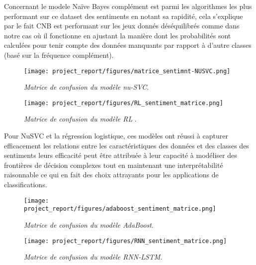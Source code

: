 Concernant le modele Naïve Bayes complément est parmi les algorithmes les plus performant sur ce dataset des sentiments en notant sa rapidité, cela s’explique par le fait CNB est performant sur les jeux donnés déséquilibrés comme dans notre cas où il fonctionne en ajustant la manière dont les probabilités sont calculées pour tenir compte des données manquants par rapport à d’autre classes (basé sur la fréquence complément).\par
\begin{figure}[h]
    \centering
    \begin{minipage}{0.45\textwidth}
        \centering
        \texttt{[image: project\_report/figures/matrice\_sentimnt-NUSVC.png]}
        \caption{\textit{Matrice de confusion du modèle nu-SVC}.}
        \label{fig:figureSHJJJR}
    \end{minipage}\hfill
    \begin{minipage}{0.45\textwidth}
        \centering
        \texttt{[image: project\_report/figures/RL\_sentiment\_matrice.png]}
        \caption{\textit{Matrice de confusion du modèle RL }.}
        \label{fig:figureNBVV}
    \end{minipage}
\end{figure} 
Pour NuSVC et la régression logistique, ces modèles ont réussi à capturer efficacement les relations entre les caractéristiques des données et des classes des sentiments leurs efficacité peut être attribuée à leur capacité à modéliser des frontières de décision complexes tout en maintenant une interprétabilité raisonnable ce qui en fait des choix attrayants pour les applications de classifications.\par
\begin{figure}[h]
    \centering
    \begin{minipage}{0.45\textwidth}
        \centering
        \texttt{[image: project\_report/figures/adaboost\_sentiment\_matrice.png]}
        \caption{\textit{Matrice de confusion du modèle AdaBoost}.}
        \label{fig:figureSHJJJR}
    \end{minipage}\hfill
    \begin{minipage}{0.45\textwidth}
        \centering
        \texttt{[image: project\_report/figures/RNN\_sentiment\_matrice.png]}
        \caption{\textit{Matrice de confusion du modèle RNN-LSTM}.}
        \label{fig:figureNBVV}
    \end{minipage}
\end{figure} 

